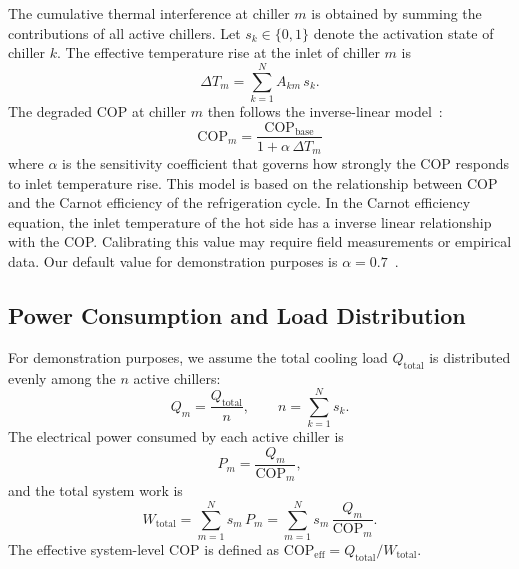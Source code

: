 \documentclass[11pt, a4paper]{article}
\newcommand{\cop}{\mathrm{COP}}
\newcommand{\copbase}{\cop_{\mathrm{base}}}
\begin{document}
The cumulative thermal interference at chiller $m$ is obtained by summing the contributions of all active chillers.
Let $s_k \in \{0, 1\}$ denote the activation state of chiller $k$.
The effective temperature rise at the inlet of chiller $m$ is
\begin{equation}
    \label{eq:temp-rise}
    \Delta T_m = \sum_{k=1}^{N} A_{km} \, s_k.
\end{equation}
The degraded COP at chiller $m$ then follows the inverse-linear model~\cite{ashrae2020hvac}:
\begin{equation}
    \label{eq:cop-degradation}
    \boxed{\;
    \cop_m = \frac{\copbase}{1 + \alpha \, \Delta T_m}
    \;}
\end{equation}
where $\alpha$ is the sensitivity coefficient that governs how strongly the COP responds to inlet temperature rise.
This model is based on the relationship between COP and the Carnot efficiency of the refrigeration cycle. In the Carnot efficiency equation, the inlet temperature of the hot side has a inverse linear relationship with the COP.
Calibrating this value may require field measurements or empirical data. Our default value for demonstration purposes is $\alpha = 0.7$~\cite{ashrae2019applications}.

\subsection{Power Consumption and Load Distribution}
\label{sec:power-consumption}

For demonstration purposes, we assume the total cooling load $Q_{\mathrm{total}}$ is distributed evenly among the $n$ active chillers:
\begin{equation}
    \label{eq:load-distribution}
    Q_m = \frac{Q_{\mathrm{total}}}{n}, \qquad n = \sum_{k=1}^{N} s_k.
\end{equation}
The electrical power consumed by each active chiller is
\begin{equation}
    \label{eq:power}
    P_m = \frac{Q_m}{\cop_m},
\end{equation}
and the total system work is
\begin{equation}
    \label{eq:total-work}
    W_{\mathrm{total}} = \sum_{m=1}^{N} s_m \, P_m = \sum_{m=1}^{N} s_m \, \frac{Q_m}{\cop_m}.
\end{equation}
The effective system-level COP is defined as $\cop_{\mathrm{eff}} = Q_{\mathrm{total}} / W_{\mathrm{total}}$.

\end{document}
